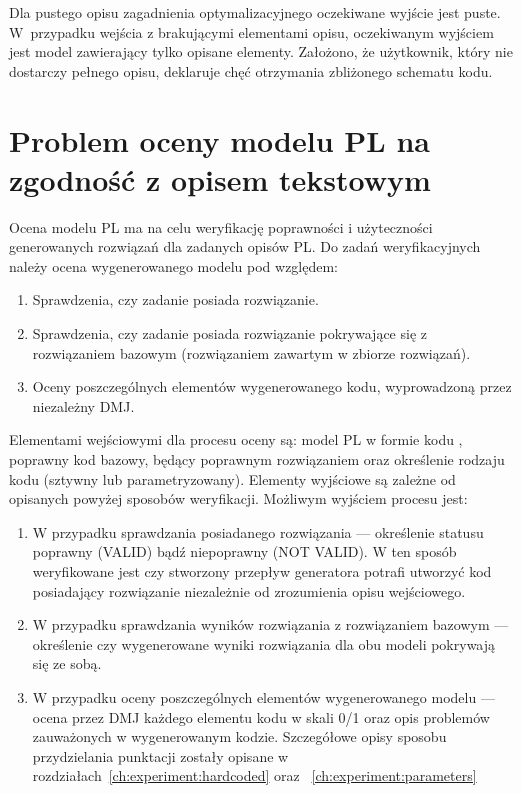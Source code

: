 Dla pustego opisu zagadnienia optymalizacyjnego oczekiwane wyjście jest puste. W~przypadku wejścia z brakującymi elementami opisu, oczekiwanym wyjściem jest model zawierający tylko opisane elementy. Założono, że użytkownik, który nie dostarczy pełnego opisu, deklaruje chęć otrzymania zbliżonego schematu kodu.

\section{Problem oceny modelu PL na zgodność z opisem tekstowym}

Ocena modelu PL ma na celu weryfikację poprawności i użyteczności generowanych rozwiązań dla zadanych opisów PL. Do zadań weryfikacyjnych należy ocena wygenerowanego modelu pod względem:

\begin{enumerate}
    \item Sprawdzenia, czy zadanie posiada rozwiązanie.
    \item Sprawdzenia, czy zadanie posiada rozwiązanie pokrywające się z rozwiązaniem bazowym (rozwiązaniem zawartym w zbiorze rozwiązań).
    \item Oceny poszczególnych elementów wygenerowanego kodu, wyprowadzoną przez niezależny DMJ.
\end{enumerate}

Elementami wejściowymi dla procesu oceny są: model PL w formie kodu , poprawny kod bazowy, będący poprawnym rozwiązaniem oraz określenie rodzaju kodu (sztywny lub parametryzowany). Elementy wyjściowe są zależne od opisanych powyżej sposobów weryfikacji. Możliwym wyjściem procesu jest:

\begin{enumerate}
    \item W przypadku sprawdzania posiadanego rozwiązania --- określenie statusu poprawny (VALID) bądź niepoprawny (NOT VALID). W ten sposób weryfikowane jest czy stworzony przepływ generatora potrafi utworzyć kod posiadający rozwiązanie niezależnie od zrozumienia opisu wejściowego.
    \item W przypadku sprawdzania wyników rozwiązania z rozwiązaniem bazowym --- określenie czy wygenerowane wyniki rozwiązania dla obu modeli pokrywają się ze sobą.
    \item W przypadku oceny poszczególnych elementów wygenerowanego modelu --- ocena przez DMJ każdego elementu kodu w skali 0/1 oraz opis problemów zauważonych w wygenerowanym kodzie. Szczegółowe opisy sposobu przydzielania punktacji zostały opisane w rozdziałach~\ref{ch:experiment:hardcoded} oraz ~\ref{ch:experiment:parameters}
\end{enumerate}

